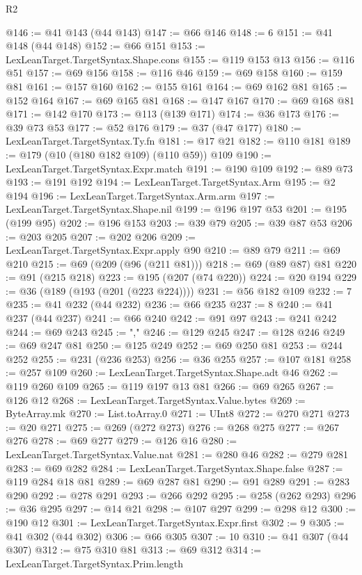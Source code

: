 \begin{lexlean}{R2}
\begin{coremodule}
{{{{{{{{{{{{{{{{{{{{{{{{{{{{{{{{{{{{{{{{{{{{{{@146 := @41 @143 (@44 @143)
@147 := @66 @146
@148 := 6
@151 := @41 @148 (@44 @148)
@152 := @66 @151
@153 := LexLeanTarget.TargetSyntax.Shape.cons
@155 := @119 @153 @13
@156 := @116 @51
@157 := @69 @156
@158 := @116 @46
@159 := @69 @158
@160 := @159 @81
@161 := @157 @160
@162 := @155 @161
@164 := @69 @162 @81
@165 := @152 @164
@167 := @69 @165 @81
@168 := @147 @167
@170 := @69 @168 @81
@171 := @142 @170
@173 := @113 (@139 @171)
@174 := @36 @173
@176 := @39 @73 @53
@177 := @52 @176
@179 := @37 (@47 @177)
@180 := LexLeanTarget.TargetSyntax.Ty.fn
@181 := @17 @21
@182 := @110 @181
@189 := @179 (@10 (@180 @182 @109) (@110 @59)) @109
@190 := LexLeanTarget.TargetSyntax.Expr.match
@191 := @190 @109
@192 := @89 @73
@193 := @191 @192
@194 := LexLeanTarget.TargetSyntax.Arm
@195 := @2 @194
@196 := LexLeanTarget.TargetSyntax.Arm.arm
@197 := LexLeanTarget.TargetSyntax.Shape.nil
@199 := @196 @197 @53
@201 := @195 (@199 @95)
@202 := @196 @153
@203 := @39 @79
@205 := @39 @87 @53
@206 := @203 @205
@207 := @202 @206
@209 := LexLeanTarget.TargetSyntax.Expr.apply @90
@210 := @89 @79
@211 := @69 @210
@215 := @69 (@209 (@96 (@211 @81)))
@218 := @69 (@89 @87) @81
@220 := @91 (@215 @218)
@223 := @195 (@207 (@74 @220))
@224 := @20 @194
@229 := @36 (@189 (@193 (@201 (@223 @224))))
@231 := @56 @182 @109
@232 := 7
@235 := @41 @232 (@44 @232)
@236 := @66 @235
@237 := 8
@240 := @41 @237 (@44 @237)
@241 := @66 @240
@242 := @91 @97
@243 := @241 @242
@244 := @69 @243
@245 := ","
@246 := @129 @245
@247 := @128 @246
@249 := @69 @247 @81
@250 := @125 @249
@252 := @69 @250 @81
@253 := @244 @252
@255 := @231 (@236 @253)
@256 := @36 @255
@257 := @107 @181
@258 := @257 @109
@260 := LexLeanTarget.TargetSyntax.Shape.adt @46
@262 := @119 @260 @109
@265 := @119 @197 @13 @81
@266 := @69 @265
@267 := @126 @12
@268 := LexLeanTarget.TargetSyntax.Value.bytes
@269 := ByteArray.mk
@270 := List.toArray.{0}
@271 := UInt8
@272 := @270 @271
@273 := @20 @271
@275 := @269 (@272 @273)
@276 := @268 @275
@277 := @267 @276
@278 := @69 @277
@279 := @126 @16
@280 := LexLeanTarget.TargetSyntax.Value.nat
@281 := @280 @46
@282 := @279 @281
@283 := @69 @282
@284 := LexLeanTarget.TargetSyntax.Shape.false
@287 := @119 @284 @18 @81
@289 := @69 @287 @81
@290 := @91 @289
@291 := @283 @290
@292 := @278 @291
@293 := @266 @292
@295 := @258 (@262 @293)
@296 := @36 @295
@297 := @14 @21
@298 := @107 @297
@299 := @298 @12
@300 := @190 @12
@301 := LexLeanTarget.TargetSyntax.Expr.first
@302 := 9
@305 := @41 @302 (@44 @302)
@306 := @66 @305
@307 := 10
@310 := @41 @307 (@44 @307)
@312 := @75 @310 @81
@313 := @69 @312
@314 := LexLeanTarget.TargetSyntax.Prim.length
}}}}}}}}}}}}}}}}}}}}}}}}}}}}}}}}}}}}}}}}}}}}}}
\end{coremodule}
\end{lexlean}
